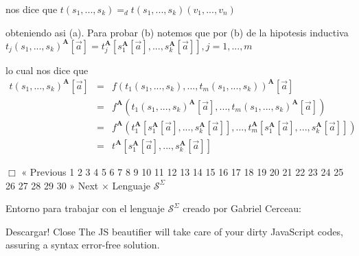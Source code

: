 nos dice que
\(\displaystyle t(s_{1},...,s_{k})=_{d}t(s_{1},...,s_{k})(v_{1},...,v_{n}) \)

obteniendo asi (a). Para probar (b) notemos que por (b) de la hipotesis inductiva
\(\displaystyle t_{j}(s_{1},...,s_{k})^{\mathbf{A}}[\vec{a}]=t_{j}^{\mathbf{A}}[s_{1}^{ \mathbf{A}}[\vec{a}],...,s_{k}^{\mathbf{A}}[\vec{a}]],j=1,...,m \)

lo cual nos dice que
\(\displaystyle \begin{array}{ccl} t(s_{1},...,s_{k})^{\mathbf{A}}[\vec{a}] & = & f(t_{1}(s_{1},...,s_{k}),...,t_{m}(s_{1},...,s_{k}))^{\mathbf{A}}[\vec{a}] \\ & = & f^{\mathbf{A}}(t_{1}(s_{1},...,s_{k})^{\mathbf{A}}[\vec{a} ],...,t_{m}(s_{1},...,s_{k})^{\mathbf{A}}[\vec{a}]) \\ & = & f^{\mathbf{A}}(t_{1}^{\mathbf{A}}[s_{1}^{\mathbf{A}}[\vec{a} ],...,s_{k}^{\mathbf{A}}[\vec{a}]],...,t_{m}^{\mathbf{A}}[s_{1}^{\mathbf{A}}[ \vec{a}],...,s_{k}^{\mathbf{A}}[\vec{a}]]) \\ & = & t^{\mathbf{A}}[s_{1}^{\mathbf{A}}[\vec{a}],...,s_{k}^{\mathbf{A}}[\vec{ a}]] \end{array} \)

\(\Box\)
« Previous
1
2
3
4
5
6
7
8
9
10
11
12
13
14
15
16
17
18
19
20
21
22
23
24
25
26
27
28
29
30
» Next
×
Lenguaje \(\mathcal{S}^{\Sigma }\)

Entorno para trabajar con el lenguaje \(\mathcal{S}^{\Sigma }\) creado por Gabriel Cerceau:

Descargar!
Close
The JS beautifier will take care of your dirty JavaScript codes, assuring a syntax error-free solution.
